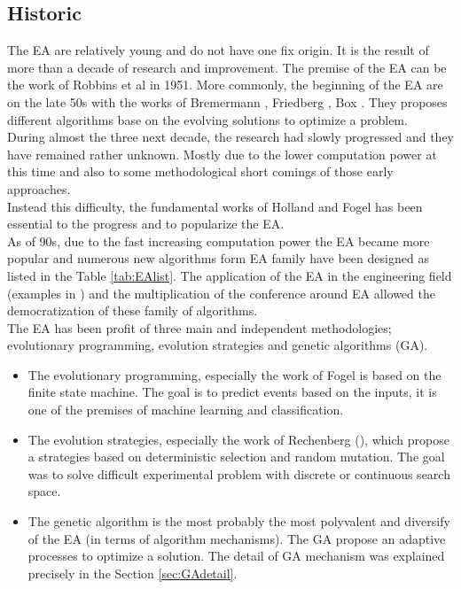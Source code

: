 \subsection{Historic}

The EA are relatively young  and do not have one fix origin. It is the result of more than a decade of research and improvement.
The premise of the EA can be the work of Robbins et al  \cite{184*robbins1951} in 1951. 
More commonly, the beginning of the EA are on the late 50s with the works of Bremermann \cite{185*bremermann1962}, Friedberg \cite{186*friedberg1958}, Box \cite{187*box1957}. They proposes different algorithms base on the evolving solutions to optimize a problem.\\ 
During almost the three next decade, the research had slowly progressed and they have remained rather unknown. Mostly due to the lower computation power at this time and also to some methodological short comings of
those early approaches. \\
Instead this difficulty, the fundamental works of Holland \cite{111*Holland1962}  and Fogel  has been essential to the progress and to popularize the EA. \\
As of 90s, due to the fast increasing computation power the EA became more popular and numerous new algorithms form EA family have been designed  as listed in the Table \ref{tab:EAlist}. The application of the EA in the engineering field (examples in \cite{10in182*alander1994}) and the multiplication of the conference around EA allowed the democratization of these family of algorithms.\\
The EA  has been profit of three main and independent methodologies; evolutionary programming, evolution strategies and genetic algorithms (GA). 

\begin{itemize}
\item The evolutionary programming, especially the work of Fogel is based on the finite state machine. The goal is to predict events based on the inputs, it is one of the premises of machine learning and classification.\\ %

\item The evolution strategies, especially the work of  Rechenberg (\cite{rechenberg1965}), which propose a strategies based on deterministic selection and random mutation. The goal was to solve difficult experimental problem with discrete or continuous search space. \\ 

\item The genetic algorithm is the most probably the most polyvalent and diversify of the EA (in terms of algorithm mechanisms). The GA propose an adaptive processes to optimize a solution. The detail of GA mechanism was explained precisely in the Section \ref{sec:GAdetail}.\\  
\end{itemize}

